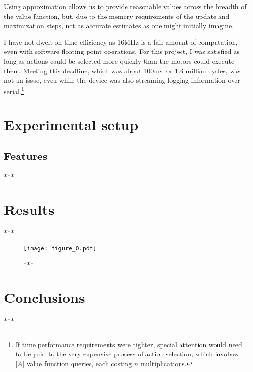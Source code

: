 \documentclass{article}
\begin{document}
	Using approximation allows us to provide reasonable values across the breadth of the value function, but, due to the memory requirements of the update and maximization steps, not as accurate estimates as one might initially imagine.
	
	I have not dwelt on time efficiency as 16MHz is a fair amount of computation, even with software floating point operations. For this project, I was satisfied as long as actions could be selected more quickly than the motors could execute them. Meeting this deadline, which was about 100ms, or 1.6 million cycles, was not an issue, even while the device was also streaming logging information over serial.\footnote{If time performance requirements were tighter, special attention would need to be paid to the very expensive process of action selection, which involves $|A|$ value function queries, each costing $n$ multiplications.}

	
	
	\section{Experimental setup}
	
	\subsection{Features}

	***
	
	
	
	\section{Results}

	
	***
	
		\begin{figure}[h]
			\begin{center}
				\texttt{[image: figure\_0.pdf]}
				\caption{***}
			\end{center}
		\end{figure}

	

	
	\section{Conclusions}

	***
	
\end{document}
